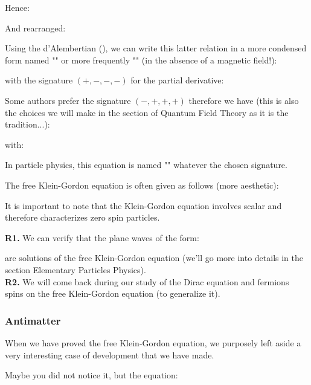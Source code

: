 	Hence:
	
	And rearranged:
	
	Using the d'Alembertian (), we can write this latter relation in a more condensed form named "" or more frequently "\label{free Klein-Gordon equation}" (in the absence of a magnetic field!):
	
	with the signature $(+, -, -, -)$ for the partial derivative:
	
	Some authors prefer the signature  $(-, +, +, +)$ therefore we have (this is also the choices we will make in the section of Quantum Field Theory as it is the tradition...):
	
	with:
	
	\begin{tcolorbox}[title=Remark,colframe=black,arc=10pt]
	In particle physics, this equation is named "" whatever the chosen signature.
	\end{tcolorbox}
	The free Klein-Gordon equation is often given as follows (more aesthetic):
	
	It is important to note that the Klein-Gordon equation involves scalar and therefore characterizes zero spin particles.
	\begin{tcolorbox}[title=Remarks,colframe=black,arc=10pt]
	\textbf{R1.} We can verify that the plane waves of the form:
	
	are solutions of the free Klein-Gordon equation (we'll go more into details in the section Elementary Particles Physics).\\
	
	\textbf{R2.} We will come back during our study of the Dirac equation and fermions spins on the free Klein-Gordon equation (to generalize it).
	\end{tcolorbox}
	
	\subsubsection{Antimatter}
	When we have proved the free Klein-Gordon equation, we purposely left aside a very interesting case of development that we have made.
	
	Maybe you did not notice it, but the equation:
	
